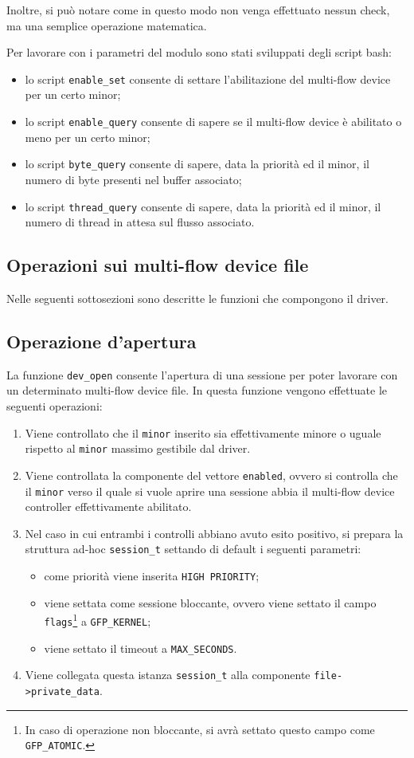 \documentclass[oneside]{article}
\begin{document}
Inoltre, si può notare come in questo modo non venga effettuato nessun check, ma una semplice operazione matematica.

Per lavorare con i parametri del modulo sono stati sviluppati degli script bash:
\begin{itemize}
\item lo script \texttt{enable\_set} consente di settare l'abilitazione del multi-flow device per un certo minor;
\item lo script \texttt{enable\_query} consente di sapere se il multi-flow device è abilitato o meno per un certo minor;
\item lo script \texttt{byte\_query} consente di sapere, data la priorità ed il minor, il numero di byte presenti nel buffer associato;
\item lo script \texttt{thread\_query} consente di sapere, data la priorità ed il minor, il numero di thread in attesa sul flusso associato.
\end{itemize}
\subsection{Operazioni sui multi-flow device file}
Nelle seguenti sottosezioni sono descritte le funzioni che compongono il driver.

\subsection{Operazione d'apertura}
La funzione \texttt{dev\_open} consente l'apertura di una sessione per poter lavorare con un determinato multi-flow device file. In questa funzione vengono effettuate le seguenti operazioni:
\begin{enumerate}
\item Viene controllato che il \texttt{minor} inserito sia effettivamente minore o uguale rispetto al \texttt{minor} massimo gestibile dal driver.
\item Viene controllata la componente del vettore \texttt{enabled}, ovvero si controlla che il \texttt{minor} verso il quale si vuole aprire una sessione abbia il multi-flow device controller effettivamente abilitato.
\item Nel caso in cui entrambi i controlli abbiano avuto esito positivo, si prepara la struttura ad-hoc \texttt{session\_t} settando di default i seguenti parametri:
\begin{itemize}
\item come priorità viene inserita \texttt{HIGH PRIORITY};
\item viene settata come sessione bloccante, ovvero viene settato il campo \texttt{flags}\footnote{In caso di operazione non bloccante, si avrà settato questo campo come \texttt{GFP\_ATOMIC}.} a \texttt{GFP\_KERNEL};
\item viene settato il timeout a \texttt{MAX\_SECONDS}.
\end{itemize}
\item Viene collegata questa istanza \texttt{session\_t} alla componente \texttt{file->private\_data}.
\end{enumerate}
\end{document}

